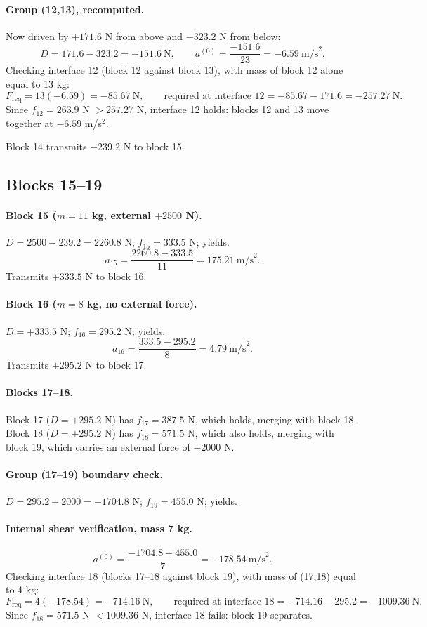\documentclass[11pt,a4paper]{article}
\begin{document}
\paragraph{Group (12,13), recomputed.} Now driven by $+171.6$ N from above and $-323.2$ N from below:
\[
D = 171.6-323.2 = -151.6\ \text{N}, \qquad a^{(0)} = \frac{-151.6}{23} = -6.59\ \text{m/s}^2 .
\]
Checking interface 12 (block 12 against block 13), with mass of block 12 alone equal to 13 kg:
\[
F_{\mathrm{req}} = 13(-6.59) = -85.67\ \text{N}, \qquad \text{required at interface 12} = -85.67-171.6 = -257.27\ \text{N}.
\]
Since $f_{12}=263.9$ N $> 257.27$ N, interface 12 holds: blocks 12 and 13 move together at $-6.59$ m/s$^2$.

Block 14 transmits $-239.2$ N to block 15.

\subsection{Blocks 15--19}

\paragraph{Block 15 ($m=11$ kg, external $+2500$ N).} $D = 2500-239.2 = 2260.8$ N; $f_{15}=333.5$ N; yields.
\[
a_{15} = \frac{2260.8-333.5}{11} = 175.21\ \text{m/s}^2 .
\]
Transmits $+333.5$ N to block 16.

\paragraph{Block 16 ($m=8$ kg, no external force).} $D=+333.5$ N; $f_{16}=295.2$ N; yields.
\[
a_{16} = \frac{333.5-295.2}{8} = 4.79\ \text{m/s}^2 .
\]
Transmits $+295.2$ N to block 17.

\paragraph{Blocks 17--18.} Block 17 ($D=+295.2$ N) has $f_{17}=387.5$ N, which holds, merging with block 18. Block 18 ($D=+295.2$ N) has $f_{18}=571.5$ N, which also holds, merging with block 19, which carries an external force of $-2000$ N.

\paragraph{Group (17--19) boundary check.} $D = 295.2-2000 = -1704.8$ N; $f_{19}=455.0$ N; yields.

\paragraph{Internal shear verification, mass 7 kg.}
\[
a^{(0)} = \frac{-1704.8+455.0}{7} = -178.54\ \text{m/s}^2 .
\]
Checking interface 18 (blocks 17--18 against block 19), with mass of (17,18) equal to 4 kg:
\[
F_{\mathrm{req}} = 4(-178.54) = -714.16\ \text{N}, \qquad \text{required at interface 18} = -714.16-295.2 = -1009.36\ \text{N}.
\]
Since $f_{18}=571.5$ N $< 1009.36$ N, interface 18 fails: block 19 separates.
\end{document}
